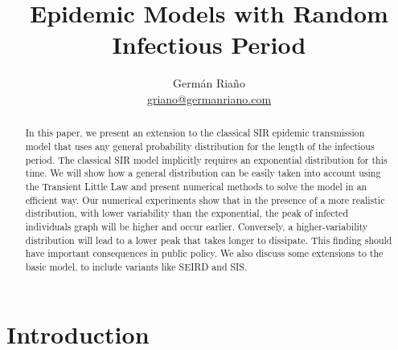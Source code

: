 \documentclass[USenglish,10pt]{article}
\begin{document}



\title{Epidemic Models with Random Infectious Period}
\author{Germ\'an Ria\~no \\ \href{mailto:griano@germanriano.com}{griano@germanriano.com}}

\maketitle


\begin{abstract}
In this paper, we present an extension to the classical SIR epidemic transmission model that uses any general probability distribution for the length of the infectious period.
The classical SIR model implicitly requires an exponential distribution for this time.
We will show how a general distribution can be easily taken into account using the Transient Little Law and present numerical methods to solve the model in an efficient way.
Our numerical experiments show that in the presence of a more realistic distribution, with lower variability than the exponential, the peak of infected individuals graph will be higher and occur earlier.
Conversely, a higher-variability distribution will lead to a lower peak that takes longer to dissipate.
This finding should have important consequences in public policy.
We also discuss some extensions to the basic model, to include variants like SEIRD and SIS.
\end{abstract}



\pagestyle{plain} %









\section{Introduction}\label{intro}
\end{document}
